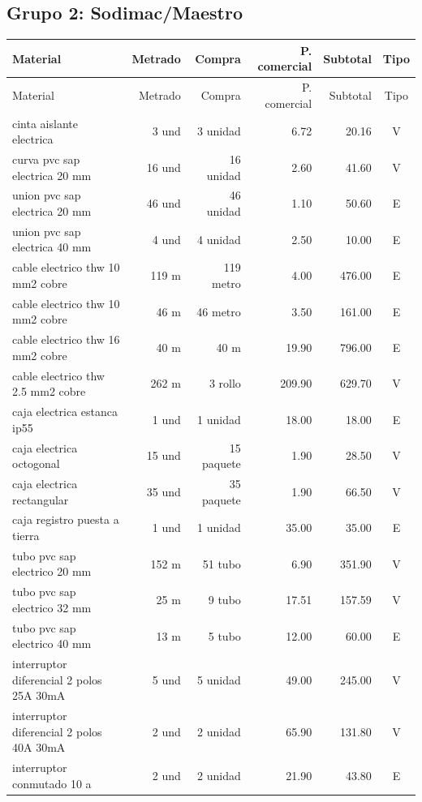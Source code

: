 \subsection{Grupo 2: Sodimac/Maestro}
\begin{landscape}\scriptsize
\begin{longtable}{p{8.0cm}r r r r c}
\toprule Material & Metrado & Compra & P. comercial & Subtotal & Tipo \\ \midrule
\endfirsthead\toprule Material & Metrado & Compra & P. comercial & Subtotal & Tipo \\ \midrule\endhead
cinta aislante electrica & 3 und & 3 unidad & 6.72 & 20.16 & V \\
curva pvc sap electrica 20 mm & 16 und & 16 unidad & 2.60 & 41.60 & V \\
union pvc sap electrica 20 mm & 46 und & 46 unidad & 1.10 & 50.60 & E \\
union pvc sap electrica 40 mm & 4 und & 4 unidad & 2.50 & 10.00 & E \\
cable electrico thw 10 mm2 cobre & 119 m & 119 metro & 4.00 & 476.00 & E \\
cable electrico thw 10 mm2 cobre & 46 m & 46 metro & 3.50 & 161.00 & E \\
cable electrico thw 16 mm2 cobre & 40 m & 40 m & 19.90 & 796.00 & E \\
cable electrico thw 2.5 mm2 cobre & 262 m & 3 rollo & 209.90 & 629.70 & V \\
caja electrica estanca ip55 & 1 und & 1 unidad & 18.00 & 18.00 & E \\
caja electrica octogonal & 15 und & 15 paquete & 1.90 & 28.50 & V \\
caja electrica rectangular & 35 und & 35 paquete & 1.90 & 66.50 & V \\
caja registro puesta a tierra & 1 und & 1 unidad & 35.00 & 35.00 & E \\
tubo pvc sap electrico 20 mm & 152 m & 51 tubo & 6.90 & 351.90 & V \\
tubo pvc sap electrico 32 mm & 25 m & 9 tubo & 17.51 & 157.59 & V \\
tubo pvc sap electrico 40 mm & 13 m & 5 tubo & 12.00 & 60.00 & E \\
interruptor diferencial 2 polos 25A 30mA & 5 und & 5 unidad & 49.00 & 245.00 & V \\
interruptor diferencial 2 polos 40A 30mA & 2 und & 2 unidad & 65.90 & 131.80 & V \\
interruptor conmutado 10 a & 2 und & 2 unidad & 21.90 & 43.80 & E \\

\end{longtable}
\end{landscape}
